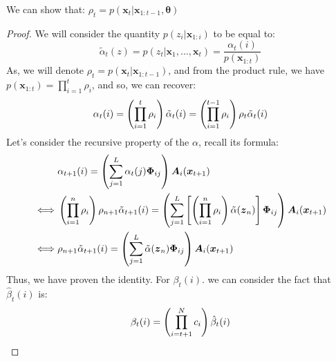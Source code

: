 \begin{proposition}
    We can show that: $\rho_t = p(\boldsymbol x_t | \boldsymbol x_{1:t-1}, \boldsymbol \theta)$
\end{proposition}
\begin{proof}
    We will consider the quantity $p(z_i | \boldsymbol x_{1:i})$ to be equal to:
    \begin{equation*}
        \tilde{\alpha}_t(z) = p(z_t | \boldsymbol x_1,\dots,\boldsymbol x_t) = \frac{\alpha_t(i)}{p(\boldsymbol x_{1:t})}
    \end{equation*}
    As, we will denote $\rho_t = p(\boldsymbol x_t | \boldsymbol x_{1:t-1})$, and from the product rule, we have $p(\boldsymbol x_{1:t}) = \prod^t_{i=1}\rho_i$, and so, we can recover:
    \begin{equation*}
        \alpha_t(i) = \left( \prod^t_{i=1} \rho_i \right) \tilde{\alpha}_t(i) = \left( \prod^{t-1}_{i=1} \rho_i \right) \rho_t \tilde{\alpha}_t(i)
    \end{equation*}
    Let's consider the recursive property of the $\alpha$, recall its formula:
    \begin{equation*}
    \begin{aligned}
        &\alpha_{t+1}(i) = \left( \sum^L_{j=1}\alpha_t(j) \boldsymbol \Phi_{ij} \right)\boldsymbol A_i(\boldsymbol x_{t+1}) \\
        \iff& \left( \prod^{n}_{i=1} \rho_i \right) \rho_{n+1} \tilde{\alpha}_{t+1}(i) = \left( \sum^L_{j=1}\left[ \left( \prod^n_{i=1} \rho_i \right) \tilde{\alpha}(\boldsymbol z_n) \right] \boldsymbol \Phi_{ij} \right)\boldsymbol A_i(\boldsymbol x_{t+1}) \\
        \iff& \rho_{n+1} \tilde{\alpha}_{t+1}(i) = \left( \sum^L_{j=1}\tilde{\alpha}(\boldsymbol z_n) \boldsymbol \Phi_{ij} \right)\boldsymbol A_i(\boldsymbol x_{t+1}) \\
    \end{aligned}
    \end{equation*}
    Thus, we have proven the identity. For $\beta_t(i)$. we can consider the fact that $\hat{\beta}_t(i)$ is:
    \begin{equation*}
        \beta_t(i) = \left( \prod^N_{i=t+1} c_i \right)\hat{\beta}_t(i)
    \end{equation*}
\end{proof}

